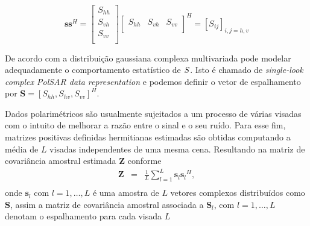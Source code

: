 \begin{equation}
\mathbf{s}\mathbf{s}^H = \left[
\begin{array}{c}
	S_{hh}      \\
        S_{vh}     \\
	S_{vv}      \\
\end{array}
\right]
\left[
\begin{array}{ccc}
	S_{hh}  & S_{vh}  & S_{vv}      \\
\end{array}
\right]^H = \left[S_{ij} \right]_{i,j=h,v}
\end{equation}

De acordo com \cite{good} a distribuição gaussiana complexa multivariada pode modelar adequadamente o comportamento estatístico de $\boldmath S$. Isto é chamado de {\it single-look complex PolSAR data representation} e podemos definir o vetor de espalhamento por $\mathbf{S}=[S_{hh},S_{hv},S_{vv}]^H$. 

Dados polarimétricos são usualmente sujeitados a um processo de várias visadas com o intuito de melhorar a razão entre o sinal e o seu ruído. Para esse fim, matrizes positivas definidas hermitianas estimadas são obtidas computando a média de $L$ visadas independentes de uma mesma cena. Resultando na matriz de covariância amostral estimada {\bf Z} conforme \cite{good, ade}
\begin{equation}
\begin{array}{ccc}
    \mathbf{Z}&=&\frac{1}{L}\displaystyle{\sum_{l=1}^{L} {\mathbf{s}_l}{\mathbf{s}_l}^H}, \\
\end{array}
\end{equation}
onde $\mathbf{s}_l$ com $l = 1, \dots, L$ é uma amostra de $\mathit{L}$ vetores complexos distribuídos como $\mathbf{S}$, assim a matriz de covariância amostral associada a $\mathbf{S}_l$, com $l=1,\dots,L$ denotam o espalhamento para cada visada $L$

